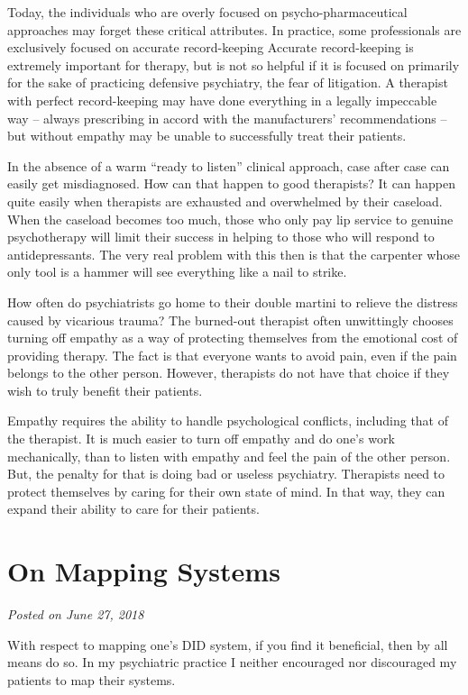 \documentclass[]{book}
\begin{document}
Today, the individuals who are overly focused on psycho-pharmaceutical approaches may forget these critical attributes. In practice, some professionals are exclusively focused on accurate record-keeping Accurate record-keeping is extremely important for therapy, but is not so helpful if it is focused on primarily for the sake of practicing defensive psychiatry, the fear of litigation. A therapist with perfect record-keeping may have done everything in a legally impeccable way -- always prescribing in accord with the manufacturers' recommendations -- but without empathy may be unable to successfully treat their patients.

In the absence of a warm ``ready to listen'' clinical approach, case after case can easily get misdiagnosed. How can that happen to good therapists? It can happen quite easily when therapists are exhausted and overwhelmed by their caseload. When the caseload becomes too much, those who only pay lip service to genuine psychotherapy will limit their success in helping to those who will respond to antidepressants. The very real problem with this then is that the carpenter whose only tool is a hammer will see everything like a nail to strike.

How often do psychiatrists go home to their double martini to relieve the distress caused by vicarious trauma? The burned-out therapist often unwittingly chooses turning off empathy as a way of protecting themselves from the emotional cost of providing therapy. The fact is that everyone wants to avoid pain, even if the pain belongs to the other person. However, therapists do not have that choice if they wish to truly benefit their patients.

Empathy requires the ability to handle psychological conflicts, including that of the therapist. It is much easier to turn off empathy and do one's work mechanically, than to listen with empathy and feel the pain of the other person. But, the penalty for that is doing bad or useless psychiatry. Therapists need to protect themselves by caring for their own state of mind. In that way, they can expand their ability to care for their patients.

\hypertarget{on-mapping-systems}{%
\section{On Mapping Systems}\label{on-mapping-systems}}

\emph{Posted on June 27, 2018}

With respect to mapping one's DID system, if you find it beneficial, then by all means do so. In my psychiatric practice I neither encouraged nor discouraged my patients to map their systems.
\end{document}
